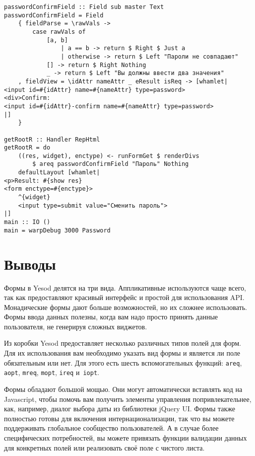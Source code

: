 \begin{lstlisting}
passwordConfirmField :: Field sub master Text
passwordConfirmField = Field
    { fieldParse = \rawVals ->
        case rawVals of
            [a, b]
                | a == b -> return $ Right $ Just a
                | otherwise -> return $ Left "Пароли не совпадают"
            [] -> return $ Right Nothing
            _ -> return $ Left "Вы должны ввести два значения"
    , fieldView = \idAttr nameAttr _ eResult isReq -> [whamlet|
<input id=#{idAttr} name=#{nameAttr} type=password>
<div>Confirm:
<input id=#{idAttr}-confirm name=#{nameAttr} type=password>
|]
    }

getRootR :: Handler RepHtml
getRootR = do
    ((res, widget), enctype) <- runFormGet $ renderDivs
        $ areq passwordConfirmField "Пароль" Nothing
    defaultLayout [whamlet|
<p>Result: #{show res}
<form enctype=#{enctype}>
    ^{widget}
    <input type=submit value="Сменить пароль">
|]
main :: IO ()
main = warpDebug 3000 Password
\end{lstlisting}

\section{Выводы}
Формы в Yesod делятся на три вида. Аппликативные используются чаще всего, так
как предоставляют красивый интерфейс и простой для использования API.
Монадические формы дают больше возможностей, но их сложнее использовать. Формы
ввода данных полезны, когда вам надо просто принять данные пользователя, не
генерируя сложных виджетов.

Из коробки Yesod предоставляет несколько различных типов полей для форм. Для
их использования вам необходимо указать вид формы и является ли поле
обязательным или нет. Для этого есть шесть вспомогательных функций:
\lstinline'areq', \lstinline'aopt', \lstinline'mreq', \lstinline'mopt',
\lstinline'ireq' и~\lstinline'iopt'.

Формы обладают большой мощью. Они могут автоматически вставлять код на
Javascript, чтобы помочь вам получить элементы управления попривлекательнее,
как, например, диалог выбора даты из библиотеки jQuery UI. Формы также
полностью готовы для включения интернационализации, так что вы можете
поддерживать глобальное сообщество пользователей. А в случае более
специфических потребностей, вы можете привязать функции валидации данных для
конкретных полей или реализовать своё поле с чистого листа.

